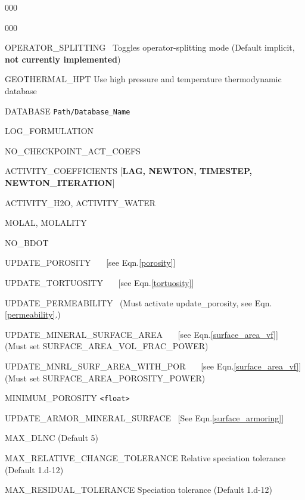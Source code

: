 \begin{deflist}{000}
\hfill\hyperlink{target_key}{\return}

\clearpage

\begin{deflist}{000}

\item[OPERATOR\_SPLITTING] \ Toggles operator-splitting mode (Default implicit, {\bf not currently implemented})
~\\
\item[GEOTHERMAL\_HPT] Use high pressure and temperature thermodynamic database
\item[DATABASE] {\tt Path/Database\_Name}
\item[LOG\_FORMULATION]
\item[NO\_CHECKPOINT\_ACT\_COEFS]
\item[ACTIVITY\_COEFFICIENTS] [{\bf LAG, NEWTON, TIMESTEP, NEWTON\_ITERATION}]
\item[ACTIVITY\_H2O, ACTIVITY\_WATER]
\item[MOLAL, MOLALITY]
\item[NO\_BDOT] 
\item[UPDATE\_POROSITY]  \ \ \ [see Eqn.\eqref{porosity}]
\item[UPDATE\_TORTUOSITY]  \ \ \ [see Eqn.\eqref{tortuosity}]
\item[UPDATE\_PERMEABILITY] \ (Must activate update\_porosity, see Eqn.\eqref{permeability}.)
\item[UPDATE\_MINERAL\_SURFACE\_AREA] \ \ \ [see Eqn.\eqref{surface_area_vf}]\\
(Must set SURFACE\_AREA\_VOL\_FRAC\_POWER)
\item[UPDATE\_MNRL\_SURF\_AREA\_WITH\_POR] \ \ \ [see Eqn.\eqref{surface_area_vf}]\\
(Must set SURFACE\_AREA\_POROSITY\_POWER)
\item[MINIMUM\_POROSITY] {\tt <float>}
\item[UPDATE\_ARMOR\_MINERAL\_SURFACE] \ [See Eqn.\eqref{surface_armoring}]
\item[MAX\_DLNC] \rm (Default 5)

\item[MAX\_RELATIVE\_CHANGE\_TOLERANCE] Relative speciation tolerance (Default 1.d-12)
\item[MAX\_RESIDUAL\_TOLERANCE] Speciation tolerance (Default 1.d-12)

\end{deflist}
~\\


\end{deflist}
